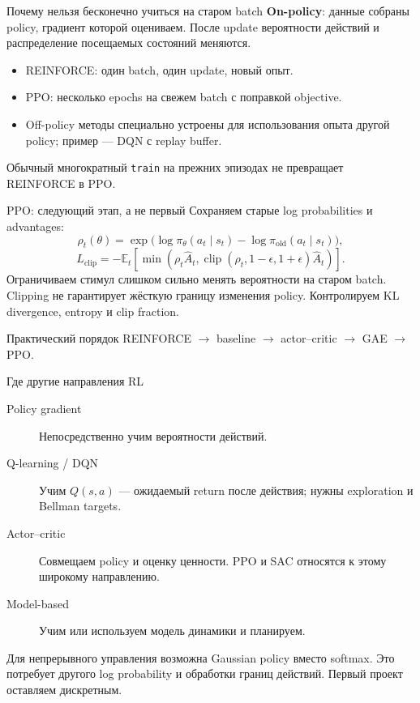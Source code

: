 \documentclass[aspectratio=169]{beamer}
\begin{document}
\begin{frame}{Почему нельзя бесконечно учиться на старом batch}
  \textbf{On-policy}: данные собраны policy, градиент которой оцениваем.
  После update вероятности действий и распределение посещаемых состояний
  меняются.
  \begin{itemize}
    \item REINFORCE: один batch, один update, новый опыт.
    \item PPO: несколько epochs на свежем batch с поправкой objective.
    \item Off-policy методы специально устроены для использования
      опыта другой policy; пример --- DQN с replay buffer.
  \end{itemize}
  Обычный многократный \texttt{train} на прежних эпизодах не превращает
  REINFORCE в PPO.
\end{frame}

\begin{frame}{PPO: следующий этап, а не первый}
  \small
  Сохраняем старые log probabilities и advantages:
  \[
    \rho_t(\theta)=\exp\bigl(\log\pi_\theta(a_t\mid s_t)
    -\log\pi_{\mathrm{old}}(a_t\mid s_t)\bigr),
  \]
  \[
    L_{\mathrm{clip}}=-\mathbb E_t\left[
      \min\left(\rho_t\widehat A_t,
      \operatorname{clip}(\rho_t,1-\epsilon,1+\epsilon)\widehat A_t\right)
    \right].
  \]
  Ограничиваем стимул слишком сильно менять вероятности на старом batch.
  Clipping не гарантирует жёсткую границу изменения policy.
  Контролируем KL divergence, entropy и clip fraction.
  \begin{block}{Практический порядок}
    REINFORCE $\rightarrow$ baseline $\rightarrow$ actor--critic
    $\rightarrow$ GAE $\rightarrow$ PPO.
  \end{block}
\end{frame}

\begin{frame}{Где другие направления RL}
  \small
  \begin{description}
    \item[Policy gradient] Непосредственно учим вероятности действий.
    \item[Q-learning / DQN] Учим $Q(s,a)$ --- ожидаемый return
      после действия; нужны exploration и Bellman targets.
    \item[Actor--critic] Совмещаем policy и оценку ценности.
      PPO и SAC относятся к этому широкому направлению.
    \item[Model-based] Учим или используем модель динамики и планируем.
  \end{description}
  Для непрерывного управления возможна Gaussian policy вместо softmax.
  Это потребует другого log probability и обработки границ действий.
  Первый проект оставляем дискретным.
\end{frame}
\end{document}
